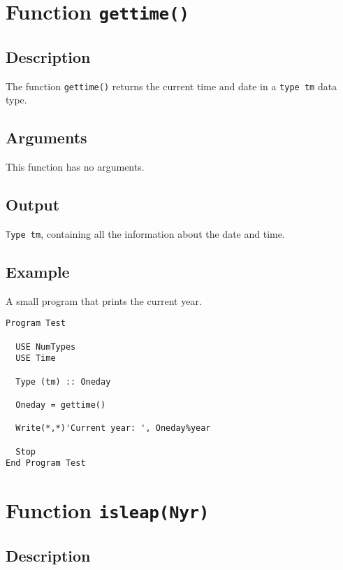 \section{Function \texttt{gettime()}}

\subsection{Description}

The function \texttt{gettime()} returns the current time and date in a
\texttt{type tm} data type.

\subsection{Arguments}

This function has no arguments. 

\subsection{Output}

\texttt{Type tm}, containing all the information about the date and
time. 

\subsection{Example}

A small program that prints the current year.

\begin{lstlisting}[emph=gettime,
                   emphstyle=\color{blue},
                   frame=trBL,
                   caption=Obtaining the current date and time.,
                   label=gettime]
Program Test

  USE NumTypes
  USE Time

  Type (tm) :: Oneday

  Oneday = gettime()

  Write(*,*)'Current year: ', Oneday%year

  Stop
End Program Test
\end{lstlisting}

\section{Function \texttt{isleap(Nyr)}}

\subsection{Description}

